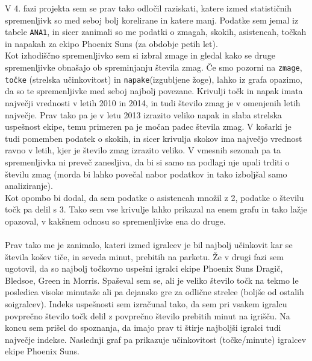 \documentclass[11pt,a4paper]{article}
\begin{document}

\newpage
V 4. fazi projekta sem se prav tako odločil raziskati, katere izmed statističnih spremenljivk so med seboj bolj korelirane in katere manj. Podatke sem jemal iz tabele \verb|ANA1|, in sicer zanimali so me podatki o zmagah, skokih, asistencah, točkah in napakah za ekipo Phoenix Suns (za obdobje petih let).\\

\newpage
Kot izhodiščno spremenljivko sem si izbral zmage in gledal kako se druge spremenljivke obnašajo ob spreminjanju števila zmag. Če smo pozorni na \verb|zmage|, \verb|točke| (strelska učinkovitost) in \verb|napake|(izgubljene žoge), lahko iz grafa opazimo, da so te spremenljivke med seboj najbolj povezane. Krivulji točk in napak imata največji vrednosti v letih 2010 in 2014, in tudi število zmag je v omenjenih letih največje. Prav tako pa je v letu 2013 izrazito veliko napak in slaba strelska uspešnost ekipe, temu primeren pa je močan padec števila zmag. V košarki je tudi pomemben podatek o skokih, in sicer krivulja skokov ima največjo vrednost ravno v letih, kjer je število zmag izrazito veliko. V vmesnih sezonah pa ta spremenljivka ni preveč zanesljiva, da bi si samo na podlagi nje upali trditi o številu zmag (morda bi lahko povečal nabor podatkov in tako izboljšal samo analiziranje).\\

Kot opombo bi dodal, da sem podatke o asistencah množil z 2, podatke o številu točk pa delil s 3. Tako sem vse krivulje lahko prikazal na enem grafu in tako lažje opazoval, v kakšnem odnosu so spremenljivke ena do druge.\\


\\

Prav tako me je zanimalo, kateri izmed igralcev je bil najbolj učinkovit kar se števila košev tiče, in seveda minut, prebitih na parketu. Že v drugi fazi sem ugotovil, da so najbolj točkovno uspešni igralci ekipe Phoenix Suns Dragič, Bledsoe, Green in Morris. Spaševal sem se, ali je veliko število točk na tekmo le posledica visoke minutaže ali pa dejansko gre za odlične strelce (boljše od ostalih soigralcev). Indeks uspešnosti sem izračunal tako, da sem pri vsakem igralcu povprečno število točk delil z povprečno število prebitih minut na igrišču. Na koncu sem prišel do spoznanja, da imajo prav ti štirje najboljši igralci tudi največje indekse. Naslednji graf pa prikazuje učinkovitost (točke/minute) igralcev ekipe Phoenix Suns.\\
\end{document}

